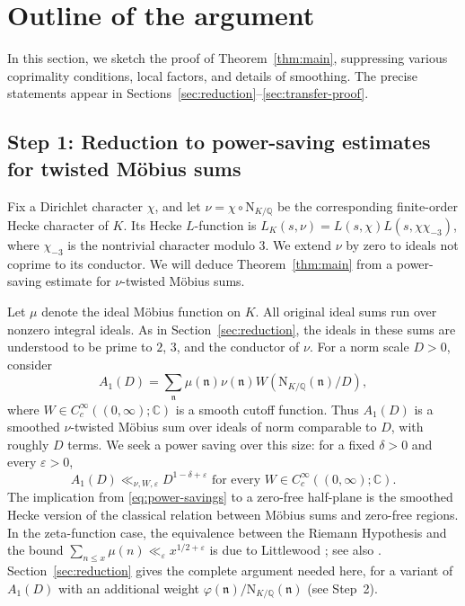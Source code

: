 \documentclass[11pt,a4paper]{article}
\numberwithin{equation}{section}
\numberwithin{figure}{section}
\theoremstyle{definition}
\theoremstyle{remark}
\newcommand{\Q}{\mathbb Q}
\newcommand{\NK}{\mathrm N_{K/\Q}}
\begin{document}
\section{Outline of the argument}\label{sec:outline}

In this section, we sketch the proof of Theorem~\ref{thm:main}, suppressing
various coprimality conditions, local factors, and details of smoothing.
The precise statements appear in Sections~\ref{sec:reduction}--\ref{sec:transfer-proof}.

\subsection{Step 1: Reduction to power-saving estimates for twisted M\"obius sums}


Fix a Dirichlet character $\chi$, and let $\nu=\chi\circ\NK$ be the corresponding finite-order Hecke character of $K$. Its Hecke $L$-function is $L_K(s,\nu)=L(s,\chi)L(s,\chi\chi_{-3})$, where $\chi_{-3}$ is the nontrivial character modulo $3$. We extend $\nu$ by zero to ideals not coprime to its conductor. We will deduce Theorem~\ref{thm:main} from a power-saving estimate for $\nu$-twisted M\"obius sums.

Let $\mu$ denote the ideal M\"obius function on $K$. All original ideal sums
run over nonzero integral ideals.
As in Section~\ref{sec:reduction}, the ideals in these sums are understood
to be prime to $2$, $3$, and the conductor of $\nu$. For a norm scale $D>0$, consider
\[
 A_1(D)=\sum_{\mathfrak n}
   \mu(\mathfrak n)\nu(\mathfrak n)
   W(\NK(\mathfrak n)/D),
\]
where $W\in C_c^\infty((0,\infty);\mathbb C)$ is a smooth cutoff function. Thus $A_1(D)$ is a smoothed $\nu$-twisted M\"obius sum over ideals of norm comparable to $D$, with roughly $D$ terms. We seek a power saving over
this size: for a fixed $\delta>0$ and every $\varepsilon>0$,
\begin{equation}\label{eq:power-savings}
A_1(D)\ll_{\nu,W,\varepsilon}D^{1-\delta+\varepsilon} \text{ for every }W\in C_c^\infty((0,\infty);\mathbb C).
\end{equation}
The implication from \eqref{eq:power-savings} to a zero-free half-plane
is the smoothed Hecke version of the classical relation between M\"obius
sums and zero-free regions. In the zeta-function case, the equivalence
between the Riemann Hypothesis and the bound
$\sum_{n\le x}\mu(n)\ll_\varepsilon x^{1/2+\varepsilon}$ is due to
Littlewood \cite{Lit12}; see also \cite[\S1]{MM09}.
Section~\ref{sec:reduction} gives the complete argument needed here, for a variant of
$A_1(D)$ with an additional weight $\varphi(\mathfrak n)/\NK(\mathfrak n)$ (see Step~2).
\end{document}
